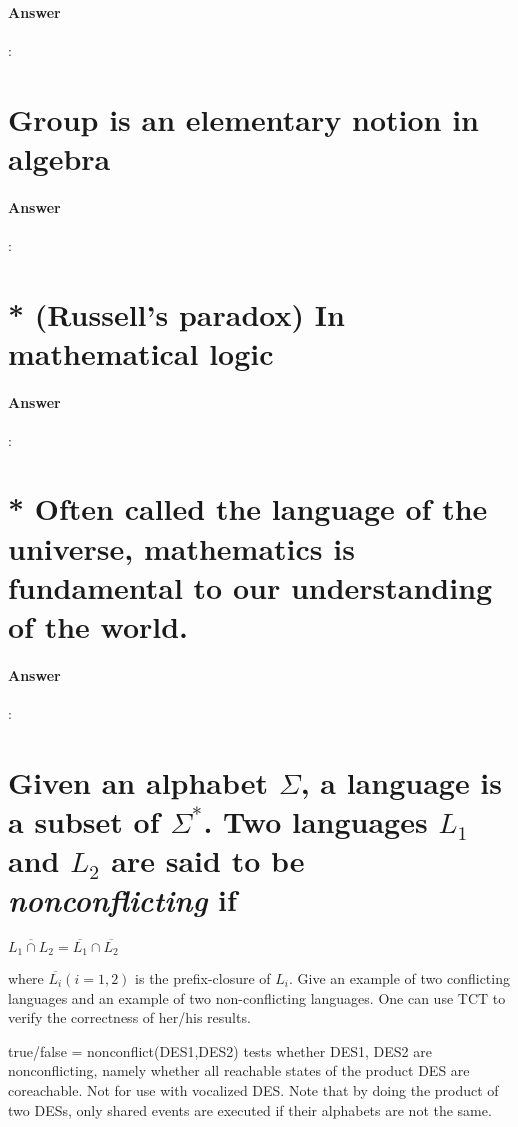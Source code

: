 \documentclass{article}
\begin{document}
\paragraph{Answer}:

\section{Group is an elementary notion in algebra}

\paragraph{Answer}:


\section{* (Russell’s paradox) In mathematical logic}

\paragraph{Answer}:

\section{* Often called the language of the universe, mathematics is fundamental to our understanding of the world.}

\paragraph{Answer}:

\section{Given an alphabet $\Sigma$, a language is a subset of $\Sigma^*$. Two languages $L_1$ and $L_2$ are said to be \textit{nonconflicting} if}

$\overline{L_1 \cap L_2} = \overline{L_1} \cap \overline{L_2} $

where $\overline{L_i} (i = 1, 2)$ is the prefix-closure of $L_i$. Give an example of two conflicting languages and an example of two non-conflicting languages. One can use TCT to verify the correctness of her/his results.

\begin{tcolorbox}
  true/false = nonconflict(DES1,DES2) tests whether DES1, DES2 are nonconflicting, namely whether all reachable states of the product DES are coreachable. Not for use with vocalized DES. Note that by doing the product of two DESs, only shared events are executed if their alphabets are not the same.
\end{tcolorbox}
\end{document}
